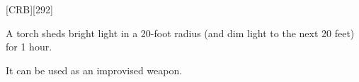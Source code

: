 
[CRB][292]

A torch sheds bright light in a 20-foot radius (and dim light to the next 20 feet) for 1 hour. 

It can be used as an improvised weapon.

{}

\vfill

